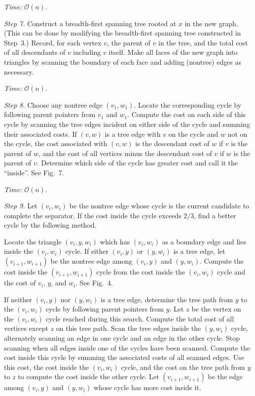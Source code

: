 \documentclass[12pt]{article}
\theoremstyle{remark}
\newcommand{\bigO}{\mathcal{O}}
\begin{document}
\begin{center}
\textit{Time:} $\bigO(n)$.
\end{center}

\noindent\textit{Step 7.} Construct a breadth-first spanning tree rooted at $x$ in
the new graph. (This can be done by modifying the breadth-first spanning tree
constructed in Step~3.) Record, for each vertex $v$, the parent of $v$ in the tree,
and the total cost of all descendants of $v$ including $v$ itself. Make all faces of
the new graph into triangles by scanning the boundary of each face and adding
(nontree) edges as necessary.

\begin{center}
\textit{Time:} $\bigO(n)$.
\end{center}

\noindent\textit{Step 8.} Choose any nontree edge $(v_1, w_1)$. Locate the
corresponding cycle by following parent pointers from $v_1$ and $w_1$. Compute the
cost on each side of this cycle by scanning the tree edges incident on either side of
the cycle and summing their associated costs. If $(v, w)$ is a tree edge with $v$ on
the cycle and $w$ not on the cycle, the cost associated with $(v, w)$ is the
descendant cost of $w$ if $v$ is the parent of $w$, and the cost of all vertices
minus the descendant cost of $v$ if $w$ is the parent of $v$. Determine which side
of the cycle has greater cost and call it the ``inside''. See Fig.~7.

\begin{center}
\textit{Time:} $\bigO(n)$.
\end{center}

\noindent\textit{Step 9.} Let $(v_i, w_i)$ be the nontree edge whose cycle is the
current candidate to complete the separator. If the cost inside the cycle exceeds
$2/3$, find a better cycle by the following method.

Locate the triangle $(v_i, y, w_i)$ which has $(v_i, w_i)$ as a boundary edge and
lies inside the $(v_i, w_i)$ cycle. If either $(v_i, y)$ or $(y, w_i)$ is a tree
edge, let $(v_{i+1}, w_{i+1})$ be the nontree edge among $(v_i, y)$ and $(y, w_i)$.
Compute the cost inside the $(v_{i+1}, w_{i+1})$ cycle from the cost inside the
$(v_i, w_i)$ cycle and the cost of $v_i$, $y$, and $w_i$. See Fig.~4.

If neither $(v_i, y)$ nor $(y, w_i)$ is a tree edge, determine the tree path from
$y$ to the $(v_i, w_i)$ cycle by following parent pointers from $y$. Let $z$ be the
vertex on the $(v_i, w_i)$ cycle reached during this search. Compute the total cost
of all vertices except $z$ on this tree path. Scan the tree edges inside the $(y,
w_i)$ cycle, alternately scanning an edge in one cycle and an edge in the other cycle.
Stop scanning when all edges inside one of the cycles have been scanned. Compute the
cost inside this cycle by summing the associated costs of all scanned edges. Use this
cost, the cost inside the $(v_i, w_i)$ cycle, and the cost on the tree path from $y$
to $z$ to compute the cost inside the other cycle. Let $(v_{i+1}, w_{i+1})$ be the
edge among $(v_i, y)$ and $(y, w_i)$ whose cycle has more cost inside it.
\end{document}
